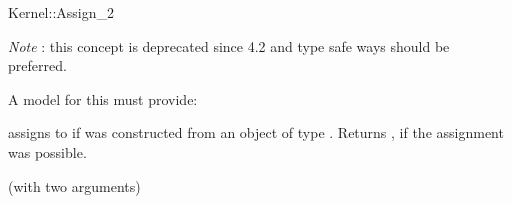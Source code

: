 \begin{ccRefFunctionObjectConcept}{Kernel::Assign_2}
\begin{ccDeprecated}
{\em Note} : this concept is deprecated since 4.2 and type safe ways should be preferred. 

A model for this must provide:

{assigns  to  if 
was constructed from an object of type .
Returns , if the assignment was possible.}

\ccRefines
{} (with two arguments)

\ccSeeAlso
  \\
 \\
  \\

\end{ccDeprecated}
\end{ccRefFunctionObjectConcept}
